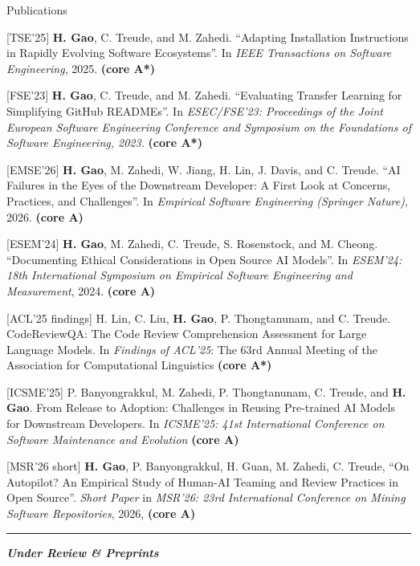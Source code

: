 \documentclass{resume}
\begin{document}
\begin{rSection}{Publications}

    [TSE'25] \textbf{H. Gao}, C. Treude, and M. Zahedi. ``Adapting Installation Instructions in Rapidly Evolving Software Ecosystems''. In \textit{IEEE Transactions on Software Engineering}, 2025.  \textbf{(core A*)}
    

    [FSE'23] \textbf{H. Gao}, C. Treude, and M. Zahedi. ``Evaluating Transfer Learning for Simplifying GitHub READMEs''. In \textit{ESEC/FSE'23: Proceedings of the Joint European Software Engineering Conference and Symposium on the Foundations of Software Engineering, 2023.} \textbf{(core A*)} 

     [EMSE'26] \textbf{H. Gao}, M. Zahedi, W. Jiang, H. Lin, J. Davis, and C. Treude. ``AI Failures in the Eyes of the Downstream Developer: A First Look at Concerns, Practices, and Challenges''. In \textit{Empirical Software Engineering (Springer Nature)}, 2026. \textbf{(core A)}
    
    
    [ESEM'24] \textbf{H. Gao}, M. Zahedi, C. Treude, S. Rosenstock, and M. Cheong. ``Documenting Ethical Considerations in Open Source AI Models''. In \textit{ESEM'24: 18th International Symposium on Empirical Software Engineering and Measurement}, 2024.  \textbf{(core A)}




    [ACL'25 findings] H. Lin, C. Liu, \textbf{H. Gao}, P. Thongtanunam, and C. Treude. CodeReviewQA: The Code Review Comprehension Assessment for Large Language Models. In \textit{Findings of ACL'25}: The 63rd Annual Meeting of the Association for Computational Linguistics \textbf{(core A*)}
    

    [ICSME'25] P. Banyongrakkul, M. Zahedi, P. Thongtanunam, C. Treude, and \textbf{H. Gao}. From Release to Adoption: Challenges in Reusing Pre-trained AI Models for Downstream Developers. In \textit{ICSME'25: 41st International Conference on Software Maintenance and Evolution} \textbf{(core A)}

    [MSR'26 short] \textbf{H. Gao}, P. Banyongrakkul, H. Guan, M. Zahedi, C. Treude, ``On Autopilot? An Empirical Study of Human-AI Teaming and Review Practices in Open Source''. \textit{Short Paper} in \textit{MSR'26: 23rd International Conference on Mining Software Repositories}, 2026, \textbf{(core A)} 
    


    \smallskip
    \hrule
    \smallskip
    {\bf \textit{Under Review \& Preprints}}
    \smallskip


\end{rSection}
\end{document}
